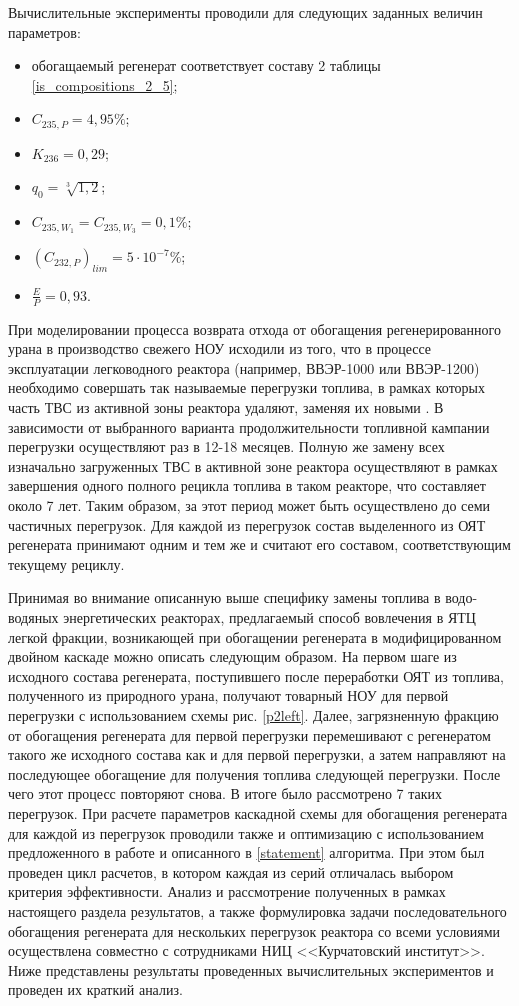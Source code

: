 Вычислительные эксперименты проводили для следующих заданных величин параметров: 

\begin{itemize}
    \item обогащаемый регенерат соответствует составу 2 таблицы \ref{is_compositions_2_5};
    \item $C_{235,{P}}=4,95\%$;
    \item $K_{236}=0,29$;
    \item $q_{0} = \sqrt[3]{1,2}$;
    \item $C_{235,{W_1}}=C_{235,{W_3}}=0,1\%$;
    \item ${(C_{232,P})}_{lim}=5\cdot10^{-7}\%$;
    \item $\frac{E}{P}=0,93$.
\end{itemize}

При моделировании процесса возврата отхода от обогащения регенерированного урана в производство свежего НОУ исходили из того, что в процессе эксплуатации легководного реактора (например, ВВЭР-1000 или ВВЭР-1200) необходимо совершать так называемые перегрузки топлива, в рамках которых часть ТВС из активной зоны реактора удаляют, заменяя их новыми \cite{острейковскийEkspluataciyaAtomnyhStanciy1999}. В зависимости от выбранного варианта продолжительности топливной кампании перегрузки осуществляют раз в 12-18 месяцев. Полную же замену всех изначально загруженных ТВС в активной зоне реактора осуществляют в рамках завершения одного полного рецикла топлива в таком реакторе, что составляет около 7 лет. Таким образом, за этот период может быть осуществлено до семи частичных перегрузок. Для каждой из перегрузок состав выделенного из ОЯТ регенерата принимают одним и тем же и считают его составом, соответствующим текущему рециклу.

Принимая во внимание описанную выше специфику замены топлива в водо-водяных энергетических реакторах, предлагаемый способ вовлечения в ЯТЦ легкой фракции, возникающей при обогащении регенерата в модифицированном двойном каскаде можно описать следующим образом. На первом шаге из исходного состава регенерата, поступившего после переработки ОЯТ из топлива, полученного из природного урана, получают товарный НОУ для первой перегрузки с использованием схемы рис. \ref{p2left}. Далее, загрязненную фракцию от обогащения регенерата для первой перегрузки перемешивают с регенератом такого же исходного состава как и для первой перегрузки, а затем направляют на последующее обогащение для получения топлива следующей перегрузки. После чего этот процесс повторяют снова. В итоге было рассмотрено 7 таких перегрузок. При расчете параметров каскадной схемы для обогащения регенерата для каждой из перегрузок проводили также и оптимизацию с использованием предложенного в работе и описанного в \ref{statement} алгоритма. При этом был проведен цикл расчетов, в котором каждая из серий отличалась выбором критерия эффективности. Анализ и рассмотрение полученных в рамках настоящего раздела результатов, а также формулировка задачи последовательного обогащения регенерата для нескольких перегрузок реактора со всеми условиями осуществлена совместно с сотрудниками НИЦ <<Курчатовский институт>>. Ниже представлены результаты проведенных вычислительных экспериментов и проведен их краткий анализ.


